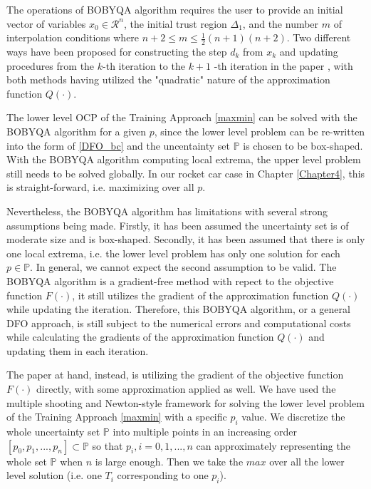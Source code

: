 \documentclass  [
  paper    = a4,
  BCOR     = 10mm,
  twoside,
  fontsize = 12pt,
  fleqn,
  toc      = bibnumbered,
  toc      = listofnumbered,
  numbers  = noendperiod,
  headings = normal,
  listof   = leveldown,
  version  = 3.03
]                                       {scrreprt}
\newcommand{\<}{\langle}
\renewcommand{\>}{\rangle}
\begin{document}
The operations of BOBYQA algorithm requires the user to provide an initial vector of variables $x_0 \in \mathcal{R}^n$, the initial trust region $\Delta_1$, and the number $m$ of interpolation conditions where $n+2 \leq m \leq \frac{1}{2}(n+1)(n+2)$. Two different ways have been proposed for constructing the step $d_k$ from $x_k$ and updating procedures from the $k$-th iteration to the $k+1$ -th iteration in the paper \cite{MicPow09}, with both methods having utilized the "quadratic" nature of the approximation function $Q(\cdot)$.

The lower level OCP of the Training Approach \ref{maxmin} can be solved with the BOBYQA algorithm for a given $p$, since the lower level problem can be re-written into the form of \ref{DFO_bc} and the uncentainty set $\mathbb{P}$ is chosen to be box-shaped. With the BOBYQA algorithm computing local extrema, the upper level problem still needs to be solved globally. In our rocket car case in Chapter \ref{Chapter4}, this is straight-forward, i.e. maximizing over all $p$. 

Nevertheless, the BOBYQA algorithm has limitations with several strong assumptions being made. Firstly, it has been assumed the uncertainty set is of moderate size and is box-shaped. Secondly, it has been assumed that there is only one local extrema, i.e. the lower level problem has only one solution for each $p \in \mathbb{P}$. In general, we cannot expect the second assumption to be valid. The BOBYQA algorithm is a gradient-free method with repect to the objective function $F(\cdot)$, it still utilizes the gradient of the approximation function $Q(\cdot)$ while updating the iteration. Therefore, this BOBYQA algorithm, or a general DFO approach, is still subject to the numerical errors and computational costs while calculating the gradients of the approximation function $Q(\cdot)$  and updating them in each iteration.  

The paper at hand, instead, is utilizing the gradient of the objective function $F(\cdot)$ directly, with some approximation applied as well. We have used the multiple shooting and Newton-style framework for solving the lower level problem of the Training Approach \ref{maxmin} with a specific $p_i$ value. We discretize the whole uncertainty set  $\mathbb{P}$ into multiple points in an increasing order $[p_0, p_1, ..., p_n] \subset \mathbb{P}$ so that $p_i, i =0, 1, ..., n$ can approximately representing the whole set  $\mathbb{P}$ when $n$ is large enough. Then we take the $max$ over all the lower level solution (i.e. one $T_i$ corresponding to one $p_i$). 
\end{document}
